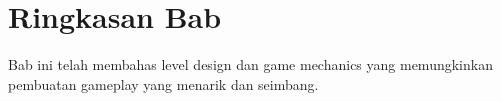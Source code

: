 \section{Ringkasan Bab}

Bab ini telah membahas level design dan game mechanics yang memungkinkan pembuatan gameplay yang menarik dan seimbang.
